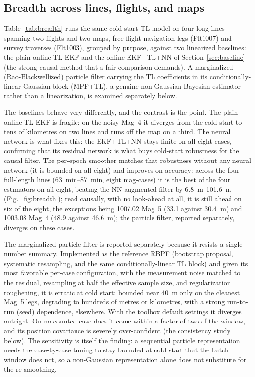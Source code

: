\documentclass{IEEEtaes}
\begin{document}
\subsection{Breadth across lines, flights, and maps}
Table~\ref{tab:breadth} runs the same cold-start TL model on four long lines
spanning two flights and two maps, free-flight navigation legs (Flt1007) and
survey traverses (Flt1003), grouped by purpose, against two
linearized baselines: the plain online-TL EKF and the online EKF+TL+NN of
Section~\ref{sec:baseline} (the strong causal method that a fair comparison
demands). A marginalized (Rao-Blackwellized) particle filter carrying the TL
coefficients in its conditionally-linear-Gaussian block (MPF+TL), a genuine
non-Gaussian Bayesian estimator rather than a linearization, is examined
separately below.

The baselines behave very differently, and the contrast is the point. The
plain online-TL EKF is fragile: on the noisy Mag~4 it diverges from the cold start
to tens of kilometres on two lines and runs off the map on a third. The neural
network is what fixes this: the EKF+TL+NN stays finite on all eight cases,
confirming that its residual network is what buys cold-start robustness for the
causal filter. The per-epoch smoother matches that robustness without any neural
network (it is bounded on all eight) and improves on accuracy: across the four
full-length lines (\SIrange{63}{87}{\minute}, eight mag-cases) it is the best of
the four estimators on all eight, beating the NN-augmented filter by
\SIrange{6.8}{101.6}{\meter} (Fig.~\ref{fig:breadth}); read causally, with no
look-ahead at all, it is still ahead on six of the eight, the exceptions being
1007.02 Mag~5 (\num{33.1} against \SI{30.4}{\meter}) and 1003.08 Mag~4
(\num{48.9} against \SI{46.6}{\meter}); the particle filter, reported
separately, diverges on these cases.

The marginalized particle filter is reported separately because it resists a
single-number summary. Implemented as the reference RBPF (bootstrap proposal,
systematic resampling, and the same conditionally-linear TL block) and given its
most favorable per-case configuration, with the measurement noise matched to the
residual, resampling at half the effective sample size, and regularization
roughening, it is erratic at cold start: bounded near \SI{40}{\meter} only on the
cleanest Mag~5 legs, degrading to hundreds of metres or kilometres, with a strong
run-to-run (seed) dependence, elsewhere. With the toolbox default settings it
diverges outright. On no counted case does it come within a factor of two of the
window, and its position covariance is severely over-confident (the consistency
study below). The sensitivity is itself the finding: a sequential particle
representation needs the case-by-case tuning to stay bounded at cold start that the
batch window does not, so a non-Gaussian representation alone does not substitute
for the re-smoothing.
\end{document}
